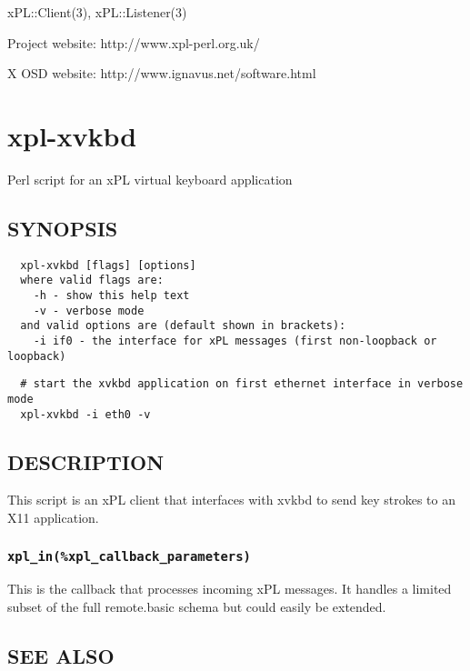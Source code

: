 \documentclass[12pt,a4paper]{article}
\begin{document}
xPL::Client(3), xPL::Listener(3)



Project website: http://www.xpl-perl.org.uk/



X OSD website: http://www.ignavus.net/software.html

\newpage
\section{xpl-xvkbd\label{xpl-xvkbd}}


Perl script for an xPL virtual keyboard application

\subsection*{SYNOPSIS\label{xpl-xvkbd_SYNOPSIS}}
\begin{verbatim}
  xpl-xvkbd [flags] [options]
  where valid flags are:
    -h - show this help text
    -v - verbose mode
  and valid options are (default shown in brackets):
    -i if0 - the interface for xPL messages (first non-loopback or loopback)
\end{verbatim}
\begin{verbatim}
  # start the xvkbd application on first ethernet interface in verbose mode
  xpl-xvkbd -i eth0 -v
\end{verbatim}
\subsection*{DESCRIPTION\label{xpl-xvkbd_DESCRIPTION}}


This script is an xPL client that interfaces with xvkbd to send key strokes
to an X11 application.

\subsubsection*{\texttt{xpl\_in(\%xpl\_callback\_parameters)}\label{xpl-xvkbd_xpl_in_xpl_callback_parameters_}}


This is the callback that processes incoming xPL messages.  It handles
a limited subset of the full remote.basic schema but could easily be
extended.

\subsection*{SEE ALSO\label{xpl-xvkbd_SEE_ALSO}}
\end{document}
